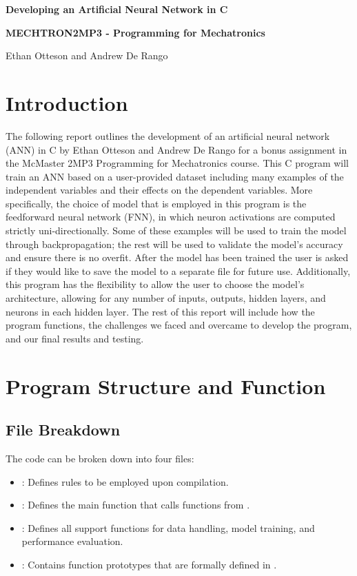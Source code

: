 \documentclass[12pt]{article}
\begin{document}
	
	\justifying
	
	\begin{center}
		\textbf{{\large Developing an Artificial Neural Network in C}}
		
		\textbf{MECHTRON2MP3 - Programming for Mechatronics} 
		
		Ethan Otteson and Andrew De Rango
	\end{center}
	
		
	
	
	\section{Introduction}

The following report outlines the development of an artificial neural network (ANN) in C by Ethan Otteson and Andrew De Rango for a bonus assignment in the McMaster 2MP3 Programming for Mechatronics course. This C program will train an ANN based on a user-provided dataset including many examples of the independent variables and their effects on the dependent variables. More specifically, the choice of model that is employed in this program is the feedforward neural network (FNN), in which neuron activations are computed strictly uni-directionally. Some of these examples will be used to train the model through backpropagation; the rest will be used to validate the model's accuracy and ensure there is no overfit. After the model has been trained the user is asked if they would like to save the model to a separate file for future use. Additionally, this program has the flexibility to allow the user to choose the model's architecture, allowing for any number of inputs, outputs, hidden layers, and neurons in each hidden layer. The rest of this report will include how the program functions, the challenges we faced and overcame to develop the program, and our final results and testing.\newpage{}

\section{ Program Structure and Function}

\subsection{File Breakdown}

	The code can be broken down into four files:
	
    \begin{itemize}
		\item {}: Defines rules to be employed upon compilation.
\item {}: Defines the main function that calls functions from .
		\item {}: Defines all support functions for data handling, model training, and performance evaluation.
		\item {}: Contains function prototypes that are formally defined in .
    \end{itemize}
\end{document}
